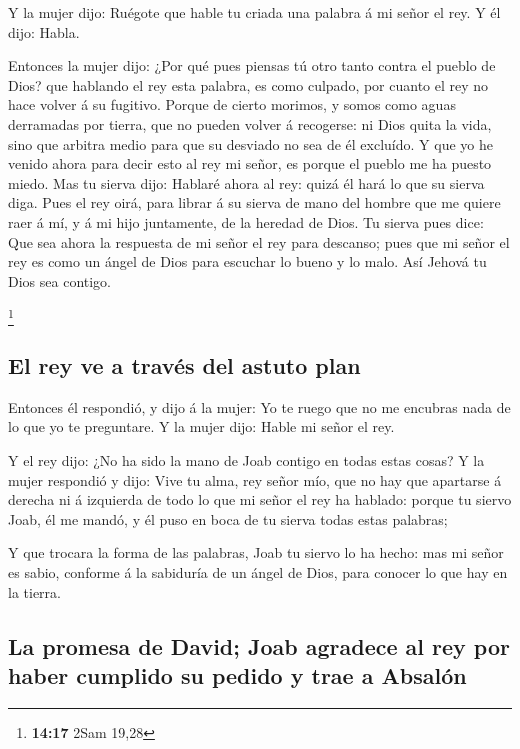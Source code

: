  Y la mujer dijo: Ruégote que hable tu criada una palabra
á mi señor el rey. Y él dijo: Habla.

 Entonces la mujer dijo: ¿Por qué pues piensas tú otro
tanto contra el pueblo de Dios? que hablando el rey esta palabra, es
como culpado, por cuanto el rey no hace volver á su fugitivo.
 Porque de cierto morimos, y somos como aguas derramadas
por tierra, que no pueden volver á recogerse: ni Dios quita la vida,
sino que arbitra medio para que su desviado no sea de él excluído.
 Y que yo he venido ahora para decir esto al rey mi
señor, es porque el pueblo me ha puesto miedo. Mas tu sierva dijo:
Hablaré ahora al rey: quizá él hará lo que su sierva diga.
 Pues el rey oirá, para librar á su sierva de mano del
hombre que me quiere raer á mí, y á mi hijo juntamente, de la heredad de
Dios.  Tu sierva pues dice: Que sea ahora la respuesta de
mi señor el rey para descanso; pues que mi señor el rey es como un ángel
de Dios para escuchar lo bueno y lo malo. Así Jehová tu Dios sea
contigo.

\footnote{\textbf{14:17} 2Sam 19,28}

\hypertarget{el-rey-ve-a-travuxe9s-del-astuto-plan}{%
\subsection{El rey ve a través del astuto
plan}\label{el-rey-ve-a-travuxe9s-del-astuto-plan}}

 Entonces él respondió, y dijo á la mujer: Yo te ruego
que no me encubras nada de lo que yo te preguntare. Y la mujer dijo:
Hable mi señor el rey.

 Y el rey dijo: ¿No ha sido la mano de Joab contigo en
todas estas cosas? Y la mujer respondió y dijo: Vive tu alma, rey señor
mío, que no hay que apartarse á derecha ni á izquierda de todo lo que mi
señor el rey ha hablado: porque tu siervo Joab, él me mandó, y él puso
en boca de tu sierva todas estas palabras;

 Y que trocara la forma de las palabras, Joab tu siervo
lo ha hecho: mas mi señor es sabio, conforme á la sabiduría de un ángel
de Dios, para conocer lo que hay en la tierra.

\hypertarget{la-promesa-de-david-joab-agradece-al-rey-por-haber-cumplido-su-pedido-y-trae-a-absaluxf3n}{%
\subsection{La promesa de David; Joab agradece al rey por haber cumplido
su pedido y trae a
Absalón}\label{la-promesa-de-david-joab-agradece-al-rey-por-haber-cumplido-su-pedido-y-trae-a-absaluxf3n}}

